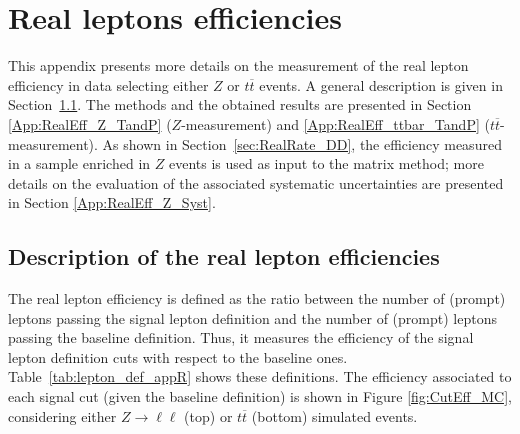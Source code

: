 \clearpage
\section{Real leptons efficiencies}
\label{App:RealEfficiency}
        This appendix presents more details on the measurement of the real lepton efficiency in data selecting either $Z$ or $t\overline{t}$ events. A general description is given in Section~\ref{App:RealEff_Intro}. The methods and the obtained results are presented in Section \ref{App:RealEff_Z_TandP} ($Z$-measurement) and \ref{App:RealEff_ttbar_TandP} ($t\overline{t}$-measurement). As shown in Section~\ref{sec:RealRate_DD}, the efficiency measured in a sample enriched in $Z$ events is used as input to the matrix method; more details on the evaluation of the associated systematic uncertainties are presented in Section \ref{App:RealEff_Z_Syst}.


	\subsection{Description of the real lepton efficiencies}
	\label{App:RealEff_Intro}
	
	The real lepton efficiency is defined as the ratio between the number of (prompt) leptons passing the signal lepton definition and the number of (prompt) leptons passing the baseline definition. Thus, it measures the efficiency of the signal lepton definition cuts with respect to the baseline ones. Table~\ref{tab:lepton_def_appR} shows these definitions. The efficiency associated to each signal cut (given the baseline definition) is shown in Figure \ref{fig:CutEff_MC}, considering either $Z\rightarrow \ell\ell$ (top) or $t\overline{t}$ (bottom) simulated events.  
	

